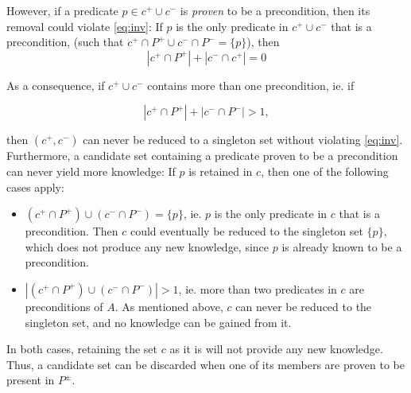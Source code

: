 \documentclass[../Master.tex]{subfiles}
\begin{document}
However, if a predicate $p \in c^+ \cup c^-$ is \textit{proven} to be a precondition, then its removal could violate \eqref{eq:inv}: If $p$ is the only predicate in $c^+ \cup c^-$ that is a precondition, (such that $c^+ \cap P^+ \cup c^- \cap P^- = \{ p \}$), then
\begin{equation*}
    \left| c^+ \cap P^+ \right| + \left| c^- \cap c^+ \right| = 0
\end{equation*}

As a consequence, if $c^+ \cup c^-$ contains more than one precondition, ie. if

\begin{equation*}
    \left| c^+ \cap P^+ \right| + \left| c^- \cap P^- \right| > 1,
\end{equation*}

then $\left( c^+, c^- \right)$ can never be reduced to a singleton set without violating \eqref{eq:inv}. Furthermore, a candidate set containing a predicate proven to be a precondition can never yield more knowledge: If $p$ is retained in $c$, then one of the following cases apply:
\begin{itemize}
    \item $\left(c^{+}\cap P^{+}\right)\cup\left(c^{-}\cap P^{-}\right)=\{ p \}$, ie. $p$ is the only predicate in $c$ that is a precondition. Then $c$ could eventually be reduced to the singleton set $\{ p \}$, which does not produce any new knowledge, since $p$ is already known to be a precondition.

    \item $\left|\left(c^{+}\cap P^{+}\right)\cup\left(c^{-}\cap P^{-}\right)\right|>1$, ie. more than two predicates in $c$ are preconditions of $A$. As mentioned above, $c$ can never be reduced to the singleton set, and no knowledge can be gained from it.
\end{itemize}
In both cases, retaining the set $c$ as it is will not provide any new knowledge. Thus, a candidate set can be discarded when one of its members are proven to be present in $P^{\pm}$.
\end{document}
